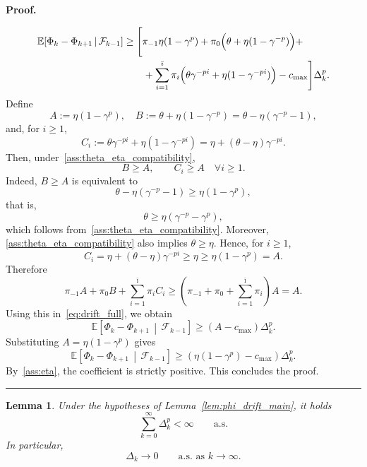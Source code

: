 \documentclass[11pt,a4paper]{article}
\newtheorem{lemma}{Lemma}[section]
\newenvironment{proof}[1][Proof]{%
  \par\noindent\textbf{#1.}\ %
}{%
  \par\vspace{-0.5 ex}            %
  \noindent\hfill\rule{0.5em}{0.5em}\par
  \vspace{1ex}
}
\newcommand{\Imax}{\bar{\imath}}%
\newcommand{\Dexp}{p}
\newcommand{\sara}[1]{{\color{red}{\textbf{[SS: #1]}}\color{black}}}
\begin{document}
\begin{proof}
\begin{equation}\label{eq:drift_full}
\begin{aligned}
\mathbb E\!\left[\Phi_k-\Phi_{k+1}\,\middle|\,\mathcal F_{k-1}\right]
&\ge \Bigg[\pi_{-1}\eta(1-\gamma^\Dexp)
+\pi_0\Bigl(\theta+\eta(1-\gamma^{-\Dexp})\Bigr)+ \\
&\qquad
+\sum_{i=1}^{\Imax}\pi_i
\Bigl(\theta\gamma^{-\Dexp i}
+\eta(1-\gamma^{-\Dexp i})\Bigr)
-c_{\max}\Bigg]\Delta_k^\Dexp .
\end{aligned}
\end{equation}
Define
\[
    A:=\eta(1-\gamma^\Dexp), \quad 
    B:=\theta+\eta(1-\gamma^{-\Dexp})
      =\theta-\eta(\gamma^{-\Dexp}-1),
\]
and, for $i\ge1$,
\[
    C_i
    :=
    \theta\gamma^{-\Dexp i}
    +
    \eta(1-\gamma^{-\Dexp i})
    =
    \eta+(\theta-\eta)\gamma^{-\Dexp i}.
\]
Then, under~\eqref{ass:theta_eta_compatibility},
\[
    B\ge A,
    \qquad
    C_i\ge A\quad \forall i\ge1.
\]
\noindent
Indeed, $B\ge A$ is equivalent to
\[
    \theta-\eta(\gamma^{-\Dexp}-1)
    \ge
    \eta(1-\gamma^\Dexp),
\]
that is,
\[
    \theta\ge \eta(\gamma^{-\Dexp}-\gamma^\Dexp),
\]
which follows from~\eqref{ass:theta_eta_compatibility}. Moreover,
\eqref{ass:theta_eta_compatibility} also implies $\theta\ge\eta$. Hence, for $i\ge1$,
\[
    C_i
    =
    \eta+(\theta-\eta)\gamma^{-\Dexp i}
    \ge
    \eta
    \ge
    \eta(1-\gamma^\Dexp)
    =
    A.
\]
Therefore
\[
    \pi_{-1}A+\pi_0B+\sum_{i=1}^{\Imax}\pi_iC_i
    \ge
    \left(\pi_{-1}+\pi_0+\sum_{i=1}^{\Imax}\pi_i\right)A
    =
    A.
\]
Using this in~\eqref{eq:drift_full}, we obtain
\[
\mathbb E\!\left[
    \Phi_k-\Phi_{k+1}
    \,\middle|\,
    \mathcal F_{k-1}
\right]
\ge
\left(
    A-c_{\max}
\right)\Delta_k^\Dexp.
\]
Substituting $A=\eta(1-\gamma^\Dexp)$ gives
\[
\mathbb E\!\left[
    \Phi_k-\Phi_{k+1}
    \,\middle|\,
    \mathcal F_{k-1}
\right]
\ge
\left(
    \eta(1-\gamma^\Dexp)-c_{\max}
\right)\Delta_k^\Dexp.
\]
By~\eqref{ass:eta}, the coefficient is strictly positive. This concludes the proof.
\end{proof}






\begin{lemma}\label{l:radius0}
Under the hypotheses of Lemma~\ref{lem:phi_drift_main},
it holds
\[
    \sum_{k=0}^{\infty}\Delta_k^{\Dexp}<\infty
    \qquad \text{a.s.}
\]
In particular,
\[
    \Delta_k\to0
    \qquad \text{a.s. as } k\to\infty .
\]
\end{lemma}
\end{document}
